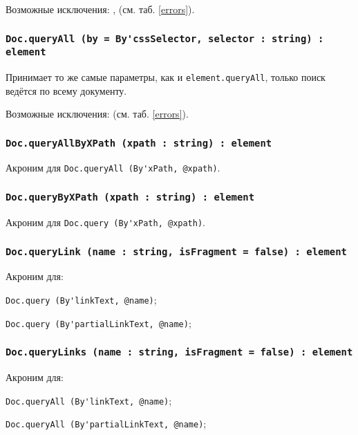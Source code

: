 Возможные исключения: ,  (см. таб. \ref{errors}).

\subsubsection{\lstinline|Doc.queryAll (by = By'cssSelector, selector : string) : element|}

Принимает то же самые параметры, как и \lstinline|element.queryAll|, только поиск ведётся по всему документу. 

Возможные исключения:  (см. таб. \ref{errors}).

\subsubsection{\lstinline|Doc.queryAllByXPath (xpath : string) : element|}

Акроним для \lstinline|Doc.queryAll (By'xPath, @xpath)|.

\subsubsection{\lstinline|Doc.queryByXPath (xpath : string) : element|}

Акроним для \lstinline|Doc.query (By'xPath, @xpath)|.

\subsubsection{\lstinline|Doc.queryLink (name : string, isFragment = false) : element|}

Акроним для:
\begin{icItems}
	\item \lstinline|Doc.query (By'linkText, @name)|;
	\item \lstinline|Doc.query (By'partialLinkText, @name)|;
\end{icItems}

\subsubsection{\lstinline|Doc.queryLinks (name : string, isFragment = false) : element|}

Акроним для:
\begin{icItems}
	\item \lstinline|Doc.queryAll (By'linkText, @name)|;
	\item \lstinline|Doc.queryAll (By'partialLinkText, @name)|;
\end{icItems}

